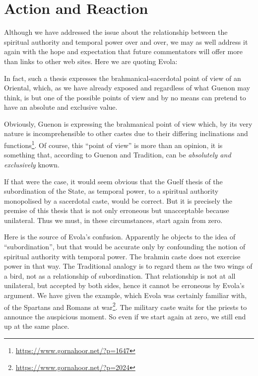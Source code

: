 \section{Action and Reaction}

Although we have addressed the issue about the relationship between the spiritual authority and temporal power over and over, we may as well address it again with the hope and expectation that future commentators will offer more than links to other web sites. Here we are quoting Evola:

\begin{quotex}
In fact, such a thesis expresses the brahmanical-sacerdotal point of view of an Oriental, which, as we have already exposed and regardless of what Guenon may think, is but one of the possible points of view and by no means can pretend to have an absolute and exclusive value.
\end{quotex}


Obviously, Guenon is expressing the brahmanical point of view which, by its very nature is incomprehensible to other castes due to their differing inclinations and functions\footnote{\url{https://www.gornahoor.net/?p=1647}}. Of course, this ``point of view'' is more than an opinion, it is something that, according to Guenon and Tradition, can be
\emph{absolutely and exclusively} known.


\begin{quotex}
If that were the case, it would seem obvious that the Guelf thesis of the subordination of the State, as temporal power, to a spiritual authority monopolised by a sacerdotal caste, would be correct. But it is precisely the premise of this thesis that is not only erroneous but unacceptable because unilateral. Thus we must, in these circumstances, start again from zero.
\end{quotex}


Here is the source of Evola's confusion. Apparently he objects to the idea of ``subordination'', but that would be accurate only by confounding the notion of spiritual authority with temporal power. The brahmin caste does not exercise power in that way. The Traditional analogy is to regard them as the two wings of a bird, not as a relationship of subordination. That relationship is not at all unilateral, but accepted by both sides, hence it cannot be erroneous by Evola's argument. We have given the example, which Evola was certainly familiar with, of the Spartans and Romans at war\footnote{\url{https://www.gornahoor.net/?p=2024}}. The military caste waits for the priests to announce the auspicious moment. So even if we start again at zero, we still end up at the same place.

